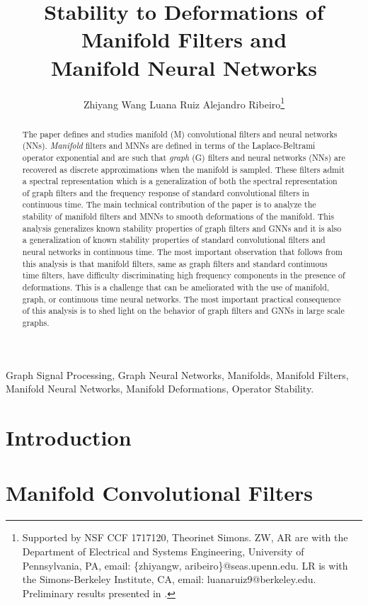 \documentclass[journal]{IEEEtran}
\title{Stability to Deformations of Manifold Filters and \\ Manifold Neural Networks}
\author{Zhiyang Wang \quad Luana Ruiz \quad Alejandro Ribeiro\thanks{Supported by NSF CCF 1717120, Theorinet Simons. ZW, AR are with the Department of Electrical and Systems Engineering, University of Pennsylvania, PA, email: \{zhiyangw, aribeiro\}@seas.upenn.edu. LR is with the Simons-Berkeley Institute, CA, email: luanaruiz9@berkeley.edu. Preliminary results presented in \cite{wang2021stability}\cite{wang2022stability}. } }
\begin{document}
\maketitle

\begin{abstract}
The paper defines and studies manifold (M) convolutional filters and neural networks (NNs). \emph{Manifold} filters and MNNs are defined in terms of the Laplace-Beltrami operator exponential and are such that \emph{graph} (G) filters and neural networks (NNs) are recovered as discrete approximations when the manifold is sampled. These filters admit a spectral representation which is a generalization of both the spectral representation of graph filters and the frequency response of standard convolutional filters in continuous time. The main technical contribution of the paper is to analyze the stability of manifold filters and MNNs to smooth deformations of the manifold. This analysis generalizes known stability properties of graph filters and GNNs and it is also a generalization of known stability properties of standard convolutional filters and neural networks in continuous time. The most important observation that follows from this analysis is that manifold filters, same as graph filters and standard continuous time filters, have difficulty discriminating high frequency components in the presence of deformations. This is a challenge that can be ameliorated with the use of manifold, graph, or continuous time neural networks. The most important practical consequence of this analysis is to shed light on the behavior of graph filters and GNNs in large scale graphs.
\end{abstract}

\begin{IEEEkeywords}
Graph Signal Processing, Graph Neural Networks, Manifolds, Manifold Filters, Manifold Neural Networks, Manifold Deformations, Operator Stability.
\end{IEEEkeywords}


\section{Introduction}
\label{sec:intro}



\section{Manifold Convolutional Filters}
\label{sec:stability_filter}

\end{document}
